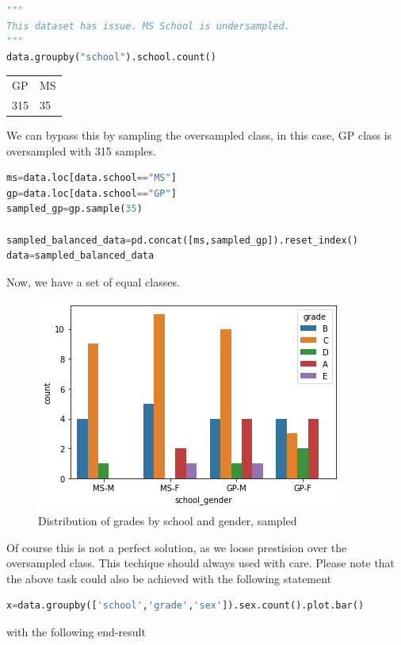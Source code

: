 \documentclass[openany]{article}
\begin{document}
		\begin{lstlisting}[language=Python]
"""
This dataset has issue. MS School is undersampled. 
"""
data.groupby("school").school.count()
		\end{lstlisting}
		\begin{table}[H]
			\centering
			\begin{tabular}{ll}
				GP  & MS \\
				315 & 35
			\end{tabular}
		\end{table}
		We can bypass this by sampling the oversampled class, in this case, GP class is oversampled with 315 samples. 
		\begin{lstlisting}[language=Python]
ms=data.loc[data.school=="MS"]
gp=data.loc[data.school=="GP"]
sampled_gp=gp.sample(35)

sampled_balanced_data=pd.concat([ms,sampled_gp]).reset_index()
data=sampled_balanced_data
		\end{lstlisting}
		Now, we have a set of equal classes.
		\begin{figure}[H]
			\iftrue
			\centering
			\caption{Distribution of grades by school and gender, sampled}
			\includegraphics[scale=0.5]{q3-a-i-2}
			\fi
		\end{figure}
		Of course this is not a perfect solution, as we loose prestision over the oversampled class. This techique should always used with care.
		Please note that the above task could also be achieved with the following statement
		\begin{lstlisting}[language=Python]
x=data.groupby(['school','grade','sex']).sex.count().plot.bar()
		\end{lstlisting}
		with the following end-result
\end{document}
